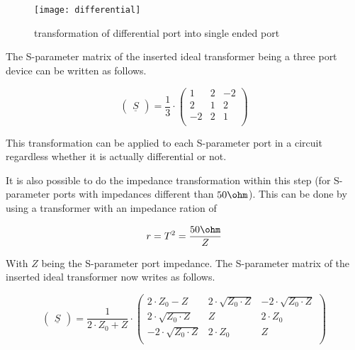 \begin{figure}[ht]
\begin{center}
\texttt{[image: differential]}
\end{center}
\caption{transformation of differential port into single ended port}
\label{fig:differential}
\end{figure}
\FloatBarrier

The S-parameter matrix of the inserted ideal transformer being a three
port device can be written as follows.

\begin{equation}
\begin{pmatrix}
\underline{S}
\end{pmatrix}
= \dfrac{1}{3}\cdot
\begin{pmatrix}
1 & 2 & -2\\
2 & 1 & 2\\
-2 & 2 & 1\\
\end{pmatrix}
\end{equation}

This transformation can be applied to each S-parameter port in a
circuit regardless whether it is actually differential or not.

\addvspace{12pt}

It is also possible to do the impedance transformation within this step
(for S-parameter ports with impedances different than $50\ohm$). This can
be done by using a transformer with an impedance ration of

\begin{equation}
r=T^2=\frac{50\ohm}{Z}
\end{equation}

With $Z$ being the S-parameter port impedance. The S-parameter matrix of
the inserted ideal transformer now writes as follows.

\begin{equation}
\begin{pmatrix}
\underline{S}
\end{pmatrix}
= \dfrac{1}{2\cdot Z_0+Z}\cdot
\begin{pmatrix}
2\cdot Z_0-Z              & 2\cdot\sqrt{Z_0\cdot Z}  & -2\cdot\sqrt{Z_0\cdot Z}\\
2\cdot\sqrt{Z_0\cdot Z}   & Z                        & 2\cdot Z_0\\
-2\cdot\sqrt{Z_0\cdot Z}  & 2\cdot Z_0               & Z\\
\end{pmatrix}
\end{equation}

